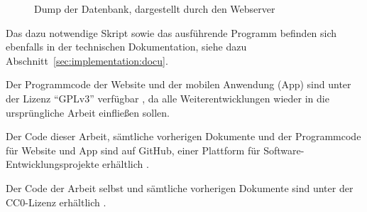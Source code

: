 \begin{figure}[ht]
  \centerline{
  }
  \caption{Dump der Datenbank, dargestellt durch den Webserver}
  \label{image:dump}
\end{figure}

Das dazu notwendige Skript sowie das ausführende Programm befinden sich 
ebenfalls in
der technischen Dokumentation, siehe dazu 
Abschnitt~\ref{sec:implementation:docu}.

Der Programmcode der Website und der mobilen Anwendung (App) sind unter der 
Lizenz "`GPLv3"' verfügbar , da alle
Weiterentwicklungen wieder in die ursprüngliche Arbeit einfließen
sollen.

Der Code dieser Arbeit, sämtliche vorherigen Dokumente und der
Programmcode für Website und App sind auf GitHub, einer
Plattform für Software-Entwicklungsprojekte erhältlich
.

Der Code der Arbeit selbst und sämtliche vorherigen Dokumente sind unter der 
CC0-Lizenz erhältlich .